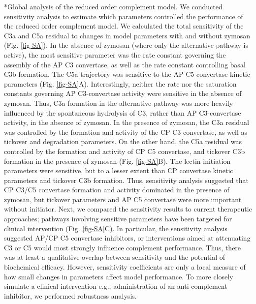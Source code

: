 \documentclass[12pt]{article}
\makeatletter
\renewcommand\subsection{\@startsection
	{subsection}{2}{0mm}
	{-0.05in}
	{-0.5\baselineskip}
	{\normalfont\normalsize\bfseries}}
\makeatother
\begin{document}
\subsection*{Global analysis of the reduced order complement model.}
We conducted sensitivity analysis to estimate which parameters controlled the performance of the reduced order complement model.
We calculated the total sensitivity of the C3a and C5a residual to changes in model parameters with and without zymosan (Fig. \ref{fig-SA}).
In the absence of zymosan (where only the alternative pathway is active), the most sensitive parameter was the rate constant governing the assembly of the AP C3 convertase, as
well as the rate constant controlling basal C3b formation. The C5a trajectory was sensitive to the AP C5 convertase kinetic parameters (Fig. \ref{fig-SA}A).
Interestingly, neither the rate nor the saturation constants governing AP C3-convertase activity were sensitive in the absence of zymosan.
Thus, C3a formation in the alternative pathway was more heavily influenced by the spontaneous hydrolysis of C3, rather than AP C3-convertase activity, in the absence of zymosan.
In the presence of zymosan, the C3a residual was controlled by the formation and activity of the CP C3 convertase, as well as tickover and degradation parameters.
On the other hand, the C5a residual was controlled by the formation and activity of CP C5 convertase, and tickover C3b formation in the presence of zymosan (Fig. \ref{fig-SA}B).
The lectin initiation parameters were sensitive, but to a lesser extent than CP convertase kinetic parameters and tickover C3b formation.
Thus, sensitivity analysis suggested that CP C3/C5 convertase formation and activity dominated in the presence of zymosan, but tickover parameters and AP C5 convertase were more important
without initiator. Next, we compared the sensitivity results to current therapeutic approaches;
pathways involving sensitive parameters have been targeted for clinical intervention (Fig. \ref{fig-SA}C).
In particular, the sensitivity analysis suggested AP/CP C5 convertase inhibitors, or interventions aimed at attenuating C3 or C5 would most strongly influence complement performance.
Thus, there was at least a qualitative overlap between sensitivity and the potential of biochemical efficacy.
However, sensitivity coefficients are only a local measure of how small changes in parameters affect model performance.
To more closely simulate a clinical intervention e.g., administration of an anti-complement inhibitor, we performed
robustness analysis.
\end{document}

